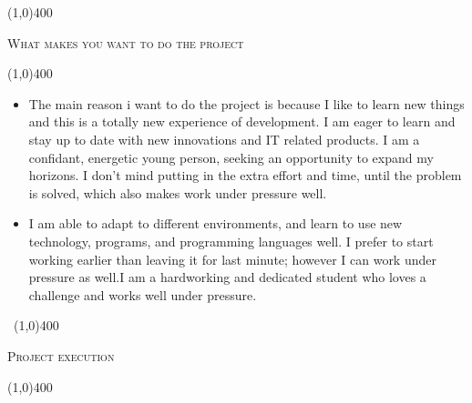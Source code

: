 \documentclass[12pt,a4paper]{report}
\begin{document}
\begin{center}
	
	\line(1,0){400}\\
	{\scshape\large What makes you want to do the project\par}
	\line(1,0){400}\\
	\end{center}
		\begin{itemize}
\item The main reason i want to do the project is because I like to learn new things and this is a totally new experience of development.  I am eager to learn and stay up to date with new innovations and IT related products. I am a
confidant, energetic young person, seeking an opportunity to expand my horizons. I don’t
mind putting in the extra effort and time, until the problem is solved, which also makes work
under pressure well.
\item I am able to adapt to different environments, and learn to use new technology, programs,
and programming languages well. I prefer to start working earlier than leaving it for last
minute; however I can work under pressure as well.I am a hardworking and dedicated student who loves a challenge and works well under
pressure.
\end{itemize}
\newpage
	\begin{center}
	\vspace*{-3cm}\
	\line(1,0){400}\\
	{\scshape\Large Project execution\par}
	\line(1,0){400}\\
	\end{center}
\end{document}
